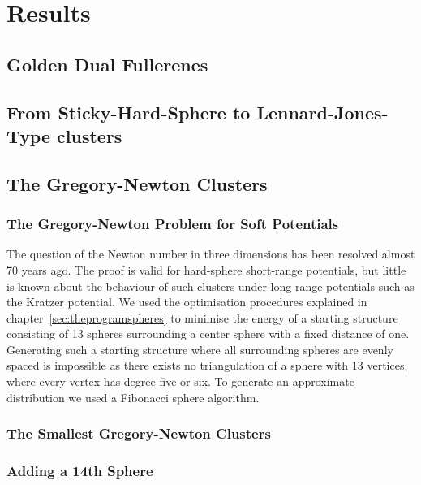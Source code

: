
\part{Results}
\label{sec:results}

\chapter{Golden Dual Fullerenes}
\label{sec:goldendualfullerenes}

\chapter{From Sticky-Hard-Sphere to Lennard-Jones-Type clusters}
\label{sec:fromstickyhardspheretoLJtypeclusters}

\chapter{The Gregory-Newton Clusters}
\label{sec:thegregorynewtonclusters}

\section{The Gregory-Newton Problem for Soft Potentials}
\label{sec:thegregorynewtonproblemforsoftpotentials}

The question of the Newton number in three dimensions has been resolved almost
70 years ago\autocite{schutte_problem_1952}. The proof is valid for hard-sphere
short-range potentials, but little is known about the behaviour of such
clusters under long-range potentials such as the Kratzer
potential\autocite{kratzer_ultraroten_1920}. We used the optimisation
procedures explained in chapter~\ref{sec:theprogramspheres} to minimise the
energy of a starting structure consisting of 13 spheres surrounding a center
sphere with a fixed distance of one. Generating such a starting structure where
all surrounding spheres are evenly spaced is impossible as there exists no
triangulation of a sphere with 13 vertices, where every vertex has degree five
or six\autocite{schwerdtfeger_topology_2015}. To generate an approximate
distribution we used a Fibonacci sphere
algorithm\autocite{gonzalez_measurement_2010,keinert_spherical_2015}.

\section{The Smallest Gregory-Newton Clusters}
\label{sec:themsmallestgregorynewtonclusters}

\section{Adding a 14th Sphere}
\label{sec:addinga14thsphere}
